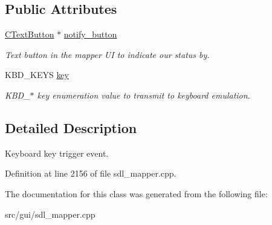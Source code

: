 \subsection*{Public Attributes}
\begin{DoxyCompactItemize}
\item 
\hypertarget{classCKeyEvent_a93407353bb472fc93fa7962f1c2e7933}{\hyperlink{classCTextButton}{C\-Text\-Button} $\ast$ \hyperlink{classCKeyEvent_a93407353bb472fc93fa7962f1c2e7933}{notify\-\_\-button}}\label{classCKeyEvent_a93407353bb472fc93fa7962f1c2e7933}

\begin{DoxyCompactList}\small\item\em Text button in the mapper U\-I to indicate our status by. \end{DoxyCompactList}\item 
\hypertarget{classCKeyEvent_aa5d774b3b526c036d79dbf87ba437afd}{K\-B\-D\-\_\-\-K\-E\-Y\-S \hyperlink{classCKeyEvent_aa5d774b3b526c036d79dbf87ba437afd}{key}}\label{classCKeyEvent_aa5d774b3b526c036d79dbf87ba437afd}

\begin{DoxyCompactList}\small\item\em K\-B\-D\-\_\-$\ast$ key enumeration value to transmit to keyboard emulation. \end{DoxyCompactList}\end{DoxyCompactItemize}


\subsection{Detailed Description}
Keyboard key trigger event. 

Definition at line 2156 of file sdl\-\_\-mapper.\-cpp.



The documentation for this class was generated from the following file\-:\begin{DoxyCompactItemize}
\item 
src/gui/sdl\-\_\-mapper.\-cpp\end{DoxyCompactItemize}
